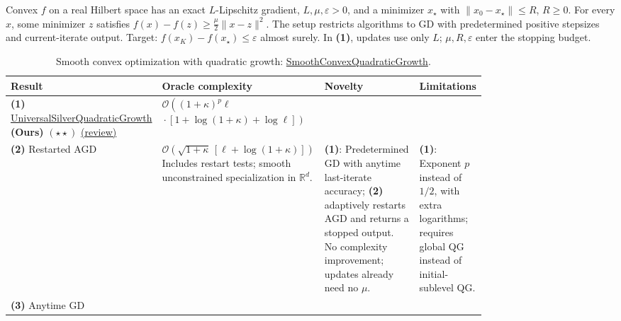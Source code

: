\begin{table}[tp]
\centering
\caption{Smooth convex optimization with quadratic growth: \href{https://github.com/k3nfalt/longtails/blob/main/LongTails/Setups/SmoothConvexQuadraticGrowth.lean}{SmoothConvexQuadraticGrowth}.}\label{tab:SmoothConvexQuadraticGrowth}
\parbox{\linewidth}{\footnotesize Convex $f$ on a real Hilbert space has an exact $L$-Lipschitz gradient, $L,\mu,\varepsilon>0$, and a minimizer $x_\star$ with $\|x_0-x_\star\|\le R$, $R\ge0$. For every $x$, some minimizer $z$ satisfies $f(x)-f(z)\ge\frac{\mu}{2}\|x-z\|^2$. The setup restricts algorithms to GD with predetermined positive stepsizes and current-iterate output. Target: $f(x_K)-f(x_\star)\le\varepsilon$ almost surely. In \textbf{(1)}, updates use only $L$; $\mu,R,\varepsilon$ enter the stopping budget.}\par\smallskip
\begin{threeparttable}
\footnotesize
\setlength{\tabcolsep}{4pt}\renewcommand{\arraystretch}{1.25}
\begin{tabularx}{\linewidth}{@{}>{\raggedright\arraybackslash}p{0.20\linewidth}>{\raggedright\arraybackslash}p{0.30\linewidth}>{\raggedright\arraybackslash}p{0.28\linewidth}>{\raggedright\arraybackslash}X@{}}
\toprule
\textbf{Result} & \textbf{Oracle complexity} & \textbf{Novelty} & \textbf{Limitations} \\
\midrule
\textbf{(1)} \href{https://github.com/k3nfalt/longtails/blob/main/LongTails/Theorems/UniversalSilverQuadraticGrowth.lean}{Universal\allowbreak Silver\allowbreak Quadratic\allowbreak Growth} \textbf{(Ours)} $(\star\star)$ \href{https://github.com/k3nfalt/longtails/blob/main/scripts/reviews/UniversalSilverQuadraticGrowth.md}{(review)}
& $\mathcal{O}\!\left((1+\kappa)^p\ell\right.$\newline $\left.{}\cdot[1+\log(1+\kappa)+\log\ell]\right)$ & & \\
\midrule[1.2pt]
\textbf{(2)} Restarted AGD \citep[Thm.~2, Sec.~3.4]{scqgFercoqQu2017}
& $\mathcal{O}\!\left(\sqrt{1+\kappa}\,[\ell+\log(1+\kappa)]\right)$\newline Includes restart tests; smooth unconstrained specialization in $\mathbb R^d$.
& \textbf{(1)}: Predetermined GD with anytime last-iterate accuracy; \textbf{(2)} adaptively restarts AGD and returns a stopped output. No complexity improvement; updates already need no $\mu$.
& \textbf{(1)}: Exponent $p$ instead of $1/2$, with extra logarithms; requires global QG instead of initial-sublevel QG. \\
\midrule
\textbf{(3)} Anytime GD \citep[Thm.~11, arXiv v2]{scqgZhang2025}

\end{tabularx}
\end{threeparttable}
\end{table}

